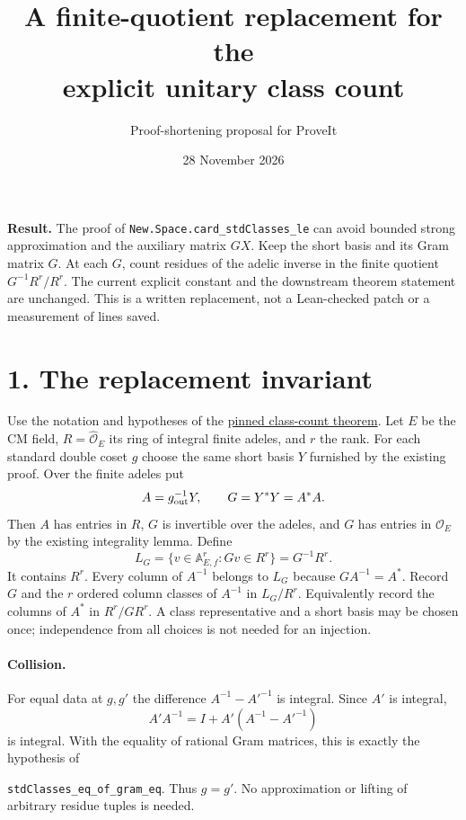\documentclass[11pt]{article}
\title{A finite-quotient replacement for the\\ explicit unitary class count}
\author{Proof-shortening proposal for ProveIt}
\date{28 November 2026}
\newcommand{\OO}{\mathcal O}
\begin{document}
\maketitle
\noindent\textbf{Result.}
The proof of \texttt{New.Space.card\_stdClasses\_le} can avoid bounded
strong approximation and the auxiliary matrix $GX$. Keep the short basis
and its Gram matrix $G$. At each $G$, count residues of the adelic inverse
in the finite quotient $G^{-1}R^r/R^r$. The current explicit constant and
the downstream theorem statement are unchanged. This is a written
replacement, not a Lean-checked patch or a measurement of lines saved.

\section*{1. The replacement invariant}
Use the notation and hypotheses of the
\href{https://github.com/VladimirReshetnikov/ProveIt/blob/2c38f343aa14c8ce85ab1c7a203774c7d05a9780/Analysis/GeneralizedRiemannHypothesis/Lean/grh/src/New/UpperBound/Size/ClassCount.lean#L116}{pinned class-count theorem}.
Let $E$ be the CM field, $R=\widehat{\OO}_E$ its ring of integral finite
adeles, and $r$ the rank. For each standard double coset $g$ choose the
same short basis $Y$ furnished by the existing proof. Over the finite adeles
put
\[
 A=g_{\rm out}^{-1}Y,\qquad G=Y^\ast Y=A^\ast A .
\]
Then $A$ has entries in $R$, $G$ is invertible over the adeles, and $G$ has
entries in $\OO_E$ by the existing integrality lemma. Define
\[
 L_G=\{v\in\mathbb A_{E,f}^{r}:Gv\in R^r\}=G^{-1}R^r .
\]
It contains $R^r$. Every column of $A^{-1}$ belongs to $L_G$ because
$GA^{-1}=A^\ast$. Record $G$ and the $r$ ordered column classes of
$A^{-1}$ in $L_G/R^r$. Equivalently record the columns of $A^\ast$ in
$R^r/GR^r$. A class representative and a short basis may be chosen once;
independence from all choices is not needed for an injection.

\paragraph{Collision.}
For equal data at $g,g'$ the difference $A^{-1}-A'^{-1}$ is integral.
Since $A'$ is integral,
\[
 A'A^{-1}=I+A'(A^{-1}-A'^{-1})
\]
is integral. With the equality of rational Gram matrices, this is exactly
the hypothesis of\par\noindent \texttt{stdClasses\_eq\_of\_gram\_eq}. Thus
$g=g'$. No approximation or lifting of arbitrary residue tuples is needed.
\end{document}
